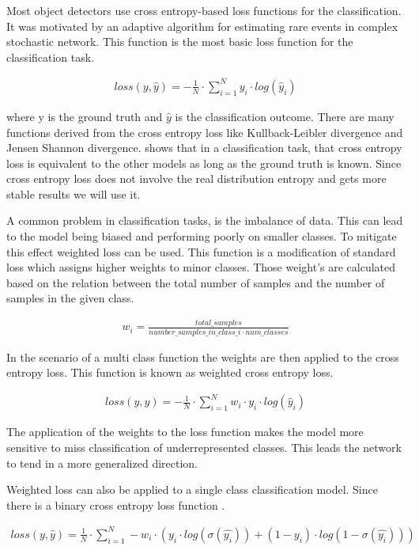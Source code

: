 \documentclass[
a4paper, 
12pt,
grayscalebody, %
abstract=on,
twoside, BCOR10mm, 12pt, DIV13,headinclude, footexclude, final, abstracton, openright
]{ibireprt}
\numberwithin{equation}{chapter}
\numberwithin{table}{chapter}
\numberwithin{figure}{chapter}
\numberwithin{algorithm}{chapter}
\numberwithin{example}{chapter}
\numberwithin{example}{chapter}
\begin{document}
Most object detectors use cross entropy-based loss functions for the classification. It was motivated by an adaptive algorithm for estimating rare events in complex stochastic network. This function is the most basic loss function for the classification task. 
 
\begin{align}
loss(y,\hat{y}) = - \frac{1}{N} \cdot \sum_{i=1}^{N}y_i \cdot log(\hat{y}_i)
\end{align}

where y is the ground truth and $\hat{y}$ is the classification outcome. There are many functions derived from the cross entropy loss like Kullback-Leibler divergence and Jensen Shannon divergence. \cite{Tian2022} shows that in a classification task, that cross entropy loss is equivalent to the other models as long as the ground truth is known. Since cross entropy loss does not involve the real distribution entropy and gets more stable results we will use it. 

A common problem in classification tasks, is the imbalance of data. This can lead to the model being biased and performing poorly on smaller classes. To mitigate this effect weighted loss can be used. This function is a modification of standard loss which assigns higher weights to minor classes. Those weight's are calculated based on the relation between the total number of samples and the number of samples in the given class. 

\begin{align}
	w_i = \frac{total\_samples}{number\_samples\_in\_class\_i \cdot num\_classes}
\end{align}

In the scenario of a multi class function the weights are then applied to the cross entropy loss. This function is known as weighted cross entropy loss. 

\begin{align}
	loss(y,\hat{y})= -	\frac{1}{N}\cdot \sum_{i=1}^{N} w_i \cdot y_i \cdot log(\hat{y}_i)
\end{align}

The application of the weights to the loss function makes the model more sensitive to miss classification of underrepresented classes. This leads the network to tend in a more generalized direction.

Weighted loss can also be applied to a single class classification model. Since there is a binary cross entropy loss function .

\begin{align}
	loss(y,\hat{y})=\frac{1}{N}\cdot\sum_{i=1}^{N} -w_i \cdot (y_i \cdot log(\sigma(\hat{y_i}))+(1-y_i)\cdot log(1-\sigma(\hat{y_i})) )
\end{align}
\end{document}

